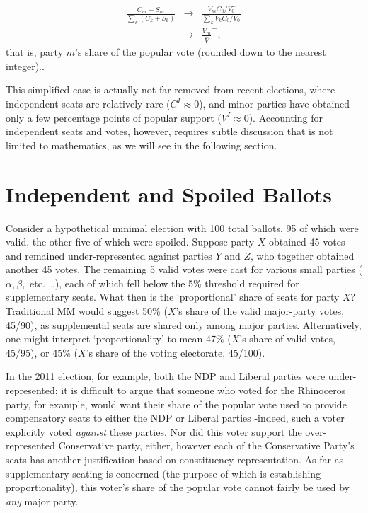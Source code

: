 \begin{align}
\label{eq:seatshare}
\frac{C_m+S_m}{ \sum\limits_k\left( C_k+S_k \right)} &\to& \frac{V_m C_0/V_0^-}{ \sum\limits_k V_k C_0/V_0^-} \\
&\to& \frac{V_m}{\hat{V}}^-,
\end{align}
that is, party $m$'s share of the popular vote (rounded down to the nearest integer)..

This simplified case is actually not far removed from recent elections, where independent seats are relatively rare ($C^I\approx0$), and minor parties have obtained only a few percentage points of popular support ($V^I \approx 0$).
Accounting for independent seats and votes, however, requires subtle discussion that is not limited to mathematics, as we will see in the following section.


\section{Independent and Spoiled Ballots}
\label{sec:outliers}
Consider a hypothetical minimal election with 100 total ballots, 95 of which were valid, the other five of which were spoiled. Suppose party $X$ obtained 45 votes and remained under-represented against parties $Y$ and $Z$, who together obtained another 45 votes. The remaining 5 valid votes were cast for various small parties ($\alpha,\beta,$ etc. \ldots), each of which fell below the 5\% threshold required for supplementary seats.
What then is the `proportional' share of seats for party $X$?
Traditional MM would suggest 50\% ($X$'s share of the valid major-party votes, 45/90), as supplemental seats are shared only among major parties. Alternatively, one might interpret `proportionality' to mean 47\% ($X$'s share of valid votes, 45/95), or 45\% ($X$'s share of the voting electorate, 45/100).


In the 2011 election, for example, both the NDP and Liberal parties were under-represented; it is difficult to argue that someone who voted for the Rhinoceros party, for example, would want their share of the popular vote used to provide compensatory seats to either the NDP or Liberal parties \--indeed, such a voter explicitly voted \emph{against} these parties.
Nor did this voter support the over-represented Conservative party, either, however each of the Conservative Party’s seats has another justification based on constituency representation.
As far as supplementary seating is concerned (the purpose of which is establishing proportionality), this voter’s share of the popular vote cannot fairly be used by \emph{any} major party.

